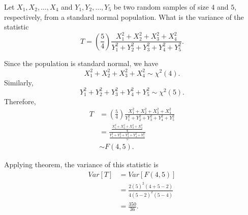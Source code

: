 \begin{example}
    Let $X_1, X_2, \ldots, X_4$ and $Y_1, Y_2, \ldots, Y_5$ be two random samples 
    of size $4$ and $5$, respectively, from a standard normal population. What is 
    the variance of the statistic 
    \[
        T = \left( \frac{5}{4} \right) \frac{X^2_1 + X^2_2 + X^2_3 + X^2_4}{Y^2_1 + Y^2_2 + Y^2_3 + Y^2_4 + Y^2_5}.
    \]
\end{example}
\begin{solution}
    Since the population is standard normal, we have 
    \[
        X^2_1 + X^2_2 + X^2_3 + X^2_4 \sim \chi^2(4).
    \]
    Similarly, 
    \[
        Y^2_1 + Y^2_2 + Y^2_3 + Y^2_4 + Y^2_5 \sim \chi^2(5).
    \]
    Therefore, 
    \begin{align*}
        T &= \left( \frac{5}{4} \right) \frac{X^2_1 + X^2_2 + X^2_3 + X^2_4}{Y^2_1 + Y^2_2 + Y^2_3 + Y^2_4 + Y^2_5}\\
        &= \frac{\displaystyle \frac{X^2_1 + X^2_2 + X^2_3 + X^2_4}{4} }{ \displaystyle \frac{Y^2_1 + Y^2_2 + Y^2_3 + Y^2_4 + Y^2_5}{5}}\\
        &\sim F(4,5).
    \end{align*}

    Applying theorem, the variance of this statistic is 
    \begin{align*}
        Var[T] &= Var[F(4,5)]\\
        &= \frac{2 (5)^2 (4 + 5 - 2)}{4 (5 - 2)^2 (5 - 4)}\\
        &= \frac{350}{36}.
    \end{align*}
\end{solution}